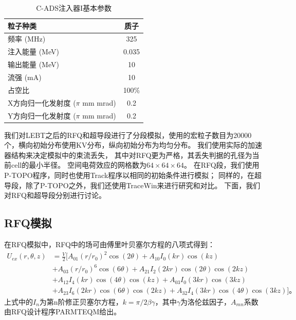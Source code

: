 \begin{table}[!htbp]
    \centering
    \footnotesize%
    \setlength{\tabcolsep}{4pt}%
    \renewcommand{\arraystretch}{1.2}%
    \caption{C-ADS注入器I基本参数}
    \begin{tabular}{lc}
        \hline\hline
        粒子种类                     & 质子 \\
        \hline
        频率 (MHz)        & 325       \\
        \hline
        注入能量 (MeV)    & 0.035     \\
        \hline
        输出能量 (MeV)    & 10        \\
        \hline
        流强 (mA)         & 10        \\
        \hline
        占空比                          & 100\%     \\
        \hline
        X方向归一化发射度 ($\pi$ mm mrad)    & 0.2        \\
        \hline
        Y方向归一化发射度 ($\pi$ mm mrad)    & 0.2        \\
        \hline\hline
    \end{tabular}
    \label{tab:C_ADS_parameters}
\end{table}

我们对LEBT之后的RFQ和超导段进行了分段模拟，使用的宏粒子数目为20000个，横向初始分布使用KV分布，纵向初始分布为均匀分布。
我们使用实际的加速器结构来决定模拟中的束流丢失，
其中对RFQ更为严格，其丢失判据的孔径为当前cell的最小半径。
空间电荷效应的网格数为$64 \times 64 \times 64$。
在RFQ段，我们使用P-TOPO程序，同时也使用Track程序\cite{aseev2005track}以相同的初始条件进行模拟；
同样的，在超导段，除了P-TOPO之外，我们还使用TraceWin\cite{uriot2014tracewin}来进行研究和对比。
下面，我们对RFQ和超导段分别进行讨论。

\subsection{RFQ模拟}
在RFQ模拟中，RFQ中的场可由傅里叶贝塞尔方程的八项式得到：
\begin{equation}
    \begin{aligned}
       {{U}_{ex}}(r,\theta ,z) & =\frac{V}{2}[{{A}_{01}}{{(r/{{r}_{0}})}^{2}}\cos (2\theta )+{{A}_{10}}{{I}_{0}}(kr)\cos (kz) \\
     & +{{A}_{03}}{{(r/{{r}_{0}})}^{6}}\cos (6\theta )+{{A}_{21}}{{I}_{2}}(2kr)\cos (2\theta )\cos (2kz) \\
     & +{{A}_{12}}{{I}_{4}}(kr)\cos (4\theta )\cos (kz)+{{A}_{03}}{{I}_{0}}(3kr)\cos (3kz) \\
     & +{{A}_{23}}{{I}_{6}}(2kr)\cos (6\theta )\cos (2kz)+{{A}_{32}}{{I}_{4}}(3kr)\cos (4\theta )\cos (3kz)] \text{。}
    \end{aligned}
    \label{eq:RFQ_8terms}
\end{equation}
上式中的$I_n$为第n阶修正贝塞尔方程，$k=\pi / 2  \beta \gamma $，其中$\gamma$为洛伦兹因子，$A_{mn}$系数由RFQ设计程序PARMTEQM给出。

